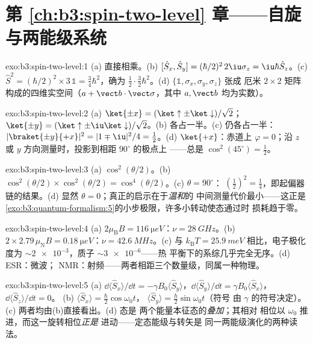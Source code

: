 \section*{第 \ref{ch:b3:spin-two-level} 章——自旋与两能级系统}

\begin{solution}{exo:b3:spin-two-level:1}
(a) 直接相乘。(b) $[\hat S_x, \hat S_y] =
(\hbar/2)^2\,2\iu\sigma_z = \iu\hbar\hat S_z$。(c) $\hat S^2 =
(\hbar/2)^2 \times 3\,\mathbb 1 = \tfrac34\hbar^2$，确为
$\tfrac12\cdot\tfrac32\hbar^2$。(d) $\{\mathbb 1, \sigma_x,
\sigma_y, \sigma_z\}$ 张成
厄米 $2\times2$ 矩阵构成的四维实空间（$a + \vect b\cdot\vect\sigma$，其中 $a,
\vect b$ 均为实数）。
\end{solution}

\begin{solution}{exo:b3:spin-two-level:2}
(a) $\ket{\pm x} = (\ket\uparrow \pm \ket\downarrow)/\sqrt2$；
$\ket{\pm y} = (\ket\uparrow \pm \iu\ket\downarrow)/\sqrt2$。(b)
各占一半。(c) 仍各占一半：$|\braket{\pm y}{+x}|^2 =
|1 \mp \iu|^2/4 = \tfrac12$。(d) $\ket{+x}$：赤道上 $\varphi =
0$；沿 $z$ 或 $y$ 方向测量时，投影到相距 $90^\circ$ 的极点上
——总是 $\cos^2(45^\circ) = \tfrac12$。
\end{solution}

\begin{solution}{exo:b3:spin-two-level:3}
(a) $\cos^2(\theta/2)$。(b) $\cos^2(\theta/2) \times
\cos^2(\theta/2) = \cos^4(\theta/2)$。(c) $\theta = 90^\circ$：
$(\tfrac12)^2 = \tfrac14$，即起偏器链的结果。(d)
显然 $\theta = 0$；真正的启示在于\emph{温和}的
中间测量代价最小——这正是
\cref{exo:b3:quantum-formalism:5}的小步极限，许多小转动使态通过时
损耗趋于零。
\end{solution}

\begin{solution}{exo:b3:spin-two-level:4}
(a) $2\mu_{\text{B}}B = \qty{116}{\micro eV}$：$\nu =
\qty{28}{GHz}$。(b) $2 \times 2.79\,\mu_{\text{N}}B =
\qty{0.18}{\micro eV}$：$\nu = \qty{42.6}{MHz}$。(c)
与 $k_{\text{B}}T = \qty{25.9}{meV}$ 相比，电子极化
度为 $\sim\num{2e-3}$，质子 $\sim\num{3e-6}$——热
平衡下的系综几乎完全无序。(d) ESR：微波；
NMR：射频——两者相距三个数量级，同属一种物理。
\end{solution}

\begin{solution}{exo:b3:spin-two-level:5}
(a) $\dd\langle\hat S_x\rangle/\dd t = -\gamma B_0\langle\hat
S_y\rangle$，$\dd\langle\hat S_y\rangle/\dd t = \gamma
B_0\langle\hat S_x\rangle$，$\dd\langle\hat S_z\rangle/\dd t = 0$。
(b) $\langle\hat S_x\rangle = \tfrac\hbar2\cos\omega_0t$，
$\langle\hat S_y\rangle = \tfrac\hbar2\sin\omega_0t$（符号
由 $\gamma$ 的符号决定）。(c) 两者均由(b)直接看出。(d) 态是
两个能量本征态的\emph{叠加}；其相对
相位以 $\omega_0$ 推进，而这一旋转相位\emph{正是}
进动——定态能级与转矢是
同一两能级演化的两种读法。
\end{solution}

